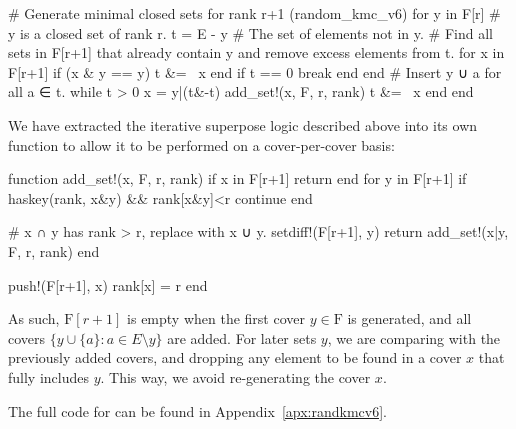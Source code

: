 \begin{jllisting}
  # Generate minimal closed sets for rank r+1 (random_kmc_v6)
  for y in F[r] # y is a closed set of rank r.
    t = E - y # The set of elements not in y.
    # Find all sets in F[r+1] that already contain y and remove excess elements from t.
    for x in F[r+1]
      if (x & y == y) t &= ~x end
      if t == 0 break end
    end
    # Insert y ∪ a for all a ∈ t.
    while t > 0
      x = y|(t&-t)
      add_set!(x, F, r, rank)
      t &= ~x
    end
  end
\end{jllisting}
We have extracted the iterative superpose logic described above into its own function to allow it to be performed on a cover-per-cover basis:
\begin{jllisting}
function add_set!(x, F, r, rank)
  if x in F[r+1] return end
  for y in F[r+1]
    if haskey(rank, x&y) && rank[x&y]<r
    continue
    end
    
    # x ∩ y has rank > r, replace with x ∪ y.
    setdiff!(F[r+1], y)
    return add_set!(x|y, F, r, rank)
  end
  
  push!(F[r+1], x)
  rank[x] = r
end
\end{jllisting}
As such, $\mathrm{F}[r+1]$ is empty when the first cover $y \in \mathrm{F}$ is generated, and all covers $\{y \cup \{a\} : a \in E \setminus y\}$ are added. For later sets $y$, we are comparing with the previously added covers, and dropping any element to be found in a cover $x$ that fully includes $y$. This way, we avoid re-generating the cover $x$.


The full code for  can be found in Appendix~\ref{apx:randkmcv6}.

